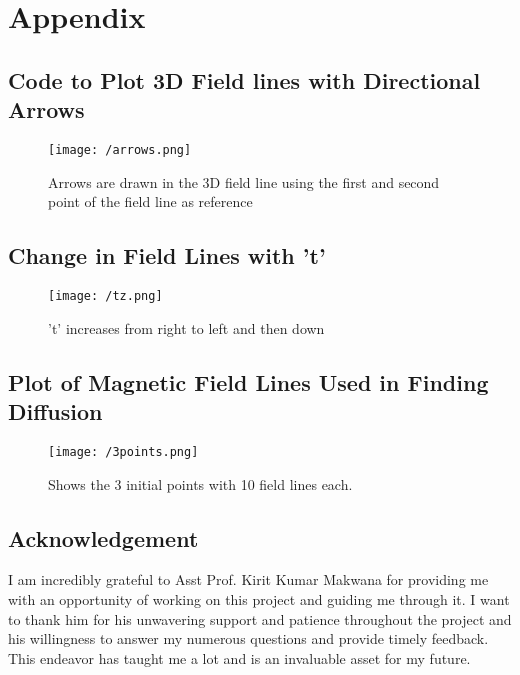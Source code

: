 \documentclass[fleqn]{report}
\begin{document}
	\chapter{Appendix}
	\section{Code to Plot 3D Field lines with Directional Arrows} 
	\begin{figure}[!ht]
		\centering
		\texttt{[image: /arrows.png]}
		\caption{Arrows are drawn in the 3D field line using the first and second point of the field line as reference}
		\label{fig:arrows}
	\end{figure}
	\section{Change in Field Lines with 't'}
	\begin{figure}[!ht]
		\centering
		\texttt{[image: /tz.png]}
		\caption{'t' increases from right to left and then down}
		\label{fig:t}
	\end{figure}
	\section{Plot of Magnetic Field Lines Used in Finding Diffusion}
	\begin{figure}[!ht]
		\centering
		\texttt{[image: /3points.png]}
		\caption{Shows the 3 initial points with 10 field lines each.}
		\label{fig:3points}
	\end{figure}
	\section{Acknowledgement}
	I am incredibly grateful to Asst Prof. Kirit Kumar Makwana for providing me with an opportunity of working on this project and guiding me through it. I want to thank him for his unwavering support and patience throughout the project and his willingness to answer my numerous questions and provide timely feedback. This endeavor has taught me a lot and is an invaluable asset for my future.	
\end{document}
